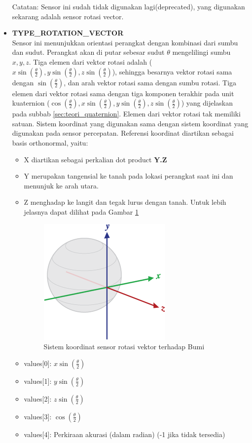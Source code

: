 \begin{itemize}
Catatan: Sensor ini sudah tidak digunakan lagi(deprecated), yang digunakan sekarang adalah sensor rotasi vector.\\
\item \textbf{TYPE\_ROTATION\_VECTOR}\\
Sensor ini menunjukkan orientasi perangkat dengan kombinasi dari sumbu dan sudut. Perangkat akan di putar sebesar sudut \(\theta\) mengelilingi sumbu \(x,y,z\). Tiga elemen dari vektor rotasi adalah (\(x \sin (\frac{\theta}{2}), y \sin (\frac{\theta}{2}), z \sin (\frac{\theta}{2})\)), sehingga besarnya vektor rotasi sama dengan \(\sin (\frac{\theta}{2})\), dan arah vektor rotasi sama dengan sumbu rotasi. Tiga elemen dari vektor rotasi sama dengan tiga komponen terakhir pada unit kuaternion (\(\cos (\frac{\theta}{2}),x \sin (\frac{\theta}{2}), y \sin (\frac{\theta}{2}), z \sin (\frac{\theta}{2})\)) yang dijelaskan pada subbab \ref{sec:teori_quaternion}. Elemen dari vektor rotasi tak memiliki satuan. Sistem koordinat yang digunakan sama dengan sistem koordinat yang digunakan pada sensor percepatan. Referensi koordinat diartikan sebagai basis orthonormal, yaitu:
\begin{itemize}
	\item X diartikan sebagai perkalian dot product \textbf{Y.Z}
	\item Y merupakan tangensial ke tanah pada lokasi perangkat saat ini dan menunjuk ke arah utara. 
	\item Z menghadap ke langit dan tegak lurus dengan tanah. Untuk lebih jelasnya dapat dilihat pada Gambar \ref{fig:axis-globe}
	\begin{figure}[htbp]
	\centering
	\includegraphics[scale=1]{Gambar/axis-globe.png}
	\caption{Sistem koordinat sensor rotasi vektor terhadap Bumi} 
	\label{fig:axis-globe}
	\end{figure}
	\item values[0]: \(x \sin (\frac{\theta}{2})\)
	\item values[1]: \(y \sin (\frac{\theta}{2})\)
	\item values[2]: \(z \sin (\frac{\theta}{2})\)
	\item values[3]: \(\cos (\frac{\theta}{2})\)
	\item values[4]: Perkiraan akurasi (dalam radian) (-1 jika tidak tersedia) 
\end{itemize}



\end{itemize}


